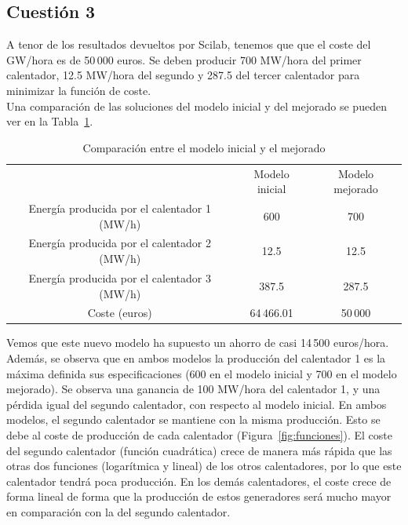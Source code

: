 \documentclass[12pt,a4paper,twoside,openright,titlepage,final]{article}
\begin{document}
\subsection{Cuestión 3}

A tenor de los resultados devueltos por Scilab, tenemos que que el coste del GW/hora es de 50\,000 euros. Se deben producir 700 MW/hora del primer calentador, 12.5 MW/hora del segundo y 287.5 del tercer calentador para minimizar la función de coste.\\

Una comparación de las soluciones del modelo inicial y del mejorado se pueden ver en la Tabla~\ref{tbl:comparacion}.\\

\begin{table}[htbp!]
\centering
\caption{Comparación entre el modelo inicial y el mejorado}
\label{tbl:comparacion}
\begin{tabular}{@{}ccc@{}}
\cmidrule(l){2-3}
                                             & Modelo inicial & Modelo mejorado \\ \cmidrule(l){2-3} 
Energía producida por el calentador 1 (MW/h) & 600            & 700             \\
Energía producida por el calentador 2 (MW/h) & 12.5           & 12.5            \\
Energía producida por el calentador 3 (MW/h) & 387.5          & 287.5           \\
Coste (euros)                                & 64\,466.01     & 50\,000         \\ \bottomrule
\end{tabular}
\end{table}

Vemos que este nuevo modelo ha supuesto un ahorro de casi 14\,500 euros/hora. Además, se observa que en ambos modelos la producción del calentador 1 es la máxima definida sus especificaciones (600 en el modelo inicial y 700 en el modelo mejorado). Se observa una ganancia de 100 MW/hora del calentador 1, y una pérdida igual del segundo calentador, con respecto al modelo inicial. En ambos modelos, el segundo calentador se mantiene con la misma producción. Esto se debe al coste de producción de cada calentador (Figura~\ref{fig:funciones}). El coste del segundo calentador (función cuadrática) crece de manera más rápida que las otras dos funciones (logarítmica y lineal) de los otros calentadores, por lo que este calentador tendrá poca producción. En los demás calentadores, el coste crece de forma lineal de forma que la producción de estos generadores será mucho mayor en comparación con la del segundo calentador.  
\end{document}

